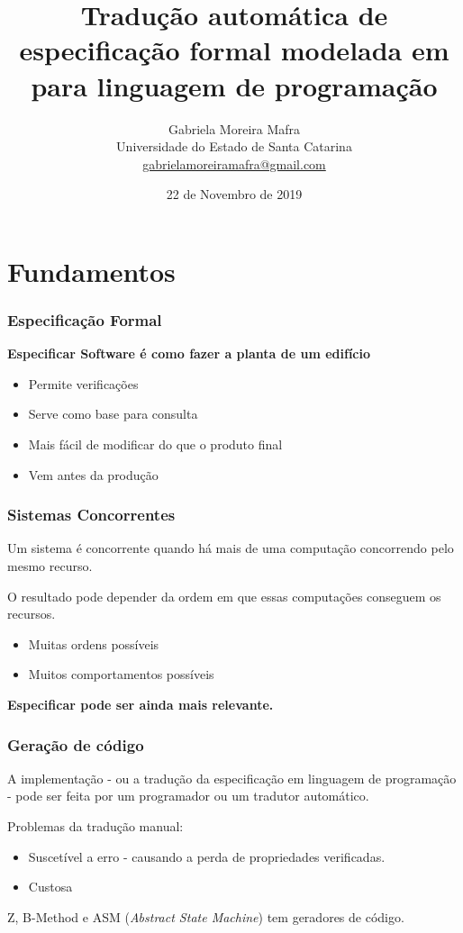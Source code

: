 \documentclass{beamer}
\title[De \TLA para linguagem de programação]{Tradução automática de especificação formal modelada em \TLA para linguagem de programação}
\author[Gabriela M. Mafra]{
    Gabriela Moreira Mafra\\\smallskip
    {\scriptsize Universidade do Estado de Santa Catarina \\\smallskip
    \vspace{-2mm}
    \url{gabrielamoreiramafra@gmail.com}}
}
\begin{document}
  \date{22 de Novembro de 2019}
  \begin{frame}
      \titlepage
  \end{frame}

\tableofcontents

\section{Fundamentos}

\begin{frame}
  \frametitle{Especificação Formal}

  \textbf{Especificar Software é como fazer a planta de um edifício}
  \begin{itemize}
    \item Permite verificações
    \item Serve como base para consulta
    \item Mais fácil de modificar do que o produto final
    \item Vem antes da produção
  \end{itemize}

\end{frame}

\begin{frame}
  \frametitle{Sistemas Concorrentes}

  Um sistema é concorrente quando há mais de uma computação concorrendo pelo mesmo recurso.\medskip

  O resultado pode depender da ordem em que essas computações conseguem os recursos.
  \begin{itemize}
    \item Muitas ordens possíveis
    \item Muitos comportamentos possíveis
  \end{itemize}

  \medskip\textbf{Especificar pode ser ainda mais relevante.}

\end{frame}

\begin{frame}
  \frametitle{Geração de código}

  A implementação - ou a tradução da especificação em linguagem de programação - pode ser feita por um programador ou um tradutor automático.\medskip

  Problemas da tradução manual:
  \begin{itemize}
    \item Suscetível a erro - causando a perda de propriedades verificadas.
    \item Custosa
  \end{itemize}\medskip

  Z, B-Method e ASM (\textit{Abstract State Machine}) tem geradores de código.\medskip

\end{frame}
\end{document}
